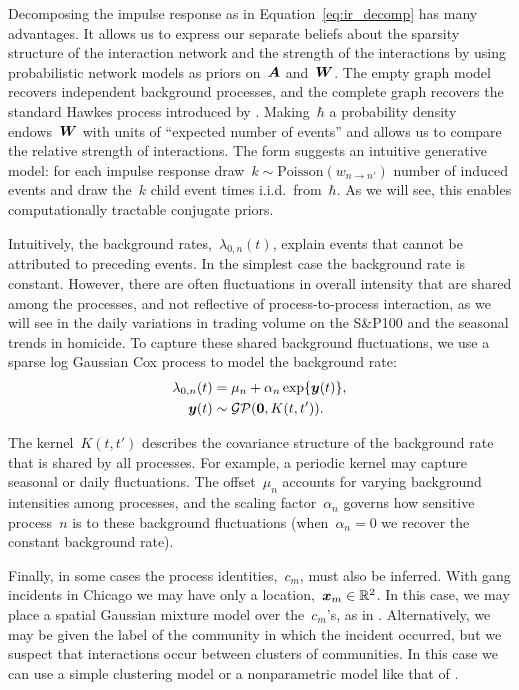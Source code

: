 Decomposing the impulse response as in Equation~\ref{eq:ir_decomp} has
many advantages. It allows us to express our separate beliefs about
the sparsity structure of the interaction network and the strength of
the interactions by using probabilistic network models as priors
on~$\boldsymbol{A}$ and~$\boldsymbol{W}$.  The empty graph model recovers independent
background processes, and the complete graph recovers the standard
Hawkes process introduced by \citet{Hawkes-1971}.  Making~$\hbar$ a
probability density endows~$\boldsymbol{W}$ with units of ``expected number of
events'' and allows us to compare the relative strength of
interactions. The form suggests an intuitive generative model: for
each impulse response draw~${k \sim \text{Poisson}(w_{n \to n'})}$
number of induced events and draw the~$k$ child event times
i.i.d.\ from~$\hbar$. As we will see, this enables computationally
tractable conjugate priors.

Intuitively, the background rates,~$\lambda_{0,n}(t)$, explain events
that cannot be attributed to preceding events. In the simplest case
the background rate is constant. However, there are often fluctuations
in overall intensity that are shared among the processes, and not
reflective of process-to-process interaction, as we will see in the
daily variations in trading volume on the S\&P100 and the seasonal
trends in homicide. To capture these shared background fluctuations,
we use a sparse log Gaussian Cox process \cite{Moller-1998} to model
the background rate:
\begin{align*}
  \lambda_{0,n}(t)
  & = \mu_{n} + \alpha_{n}\exp\{\boldsymbol{y}(t)\}, \\
  \boldsymbol{y}(t) &\sim \mathcal{GP}(\boldsymbol{0},K(t,t')).
\end{align*}

The kernel~${K(t,t')}$ describes the covariance structure of the
background rate that is shared by all processes. For example, a
periodic kernel may capture seasonal or daily fluctuations. The
offset~${\mu_n}$ accounts for varying background intensities among
processes, and the scaling factor~$\alpha_n$ governs how sensitive
process~$n$ is to these background fluctuations (when~${\alpha_n=0}$
we recover the constant background rate).

Finally, in some cases the process identities,~${c_m}$, must also be
inferred. With gang incidents in Chicago we may have only a
location,~${\boldsymbol{x}_m\in\mathbb{R}^2}$. In this case, we may place a spatial
Gaussian mixture model over the~$c_m$'s, as in
\citet{Cho-2013}. Alternatively, we may be given the label of the
community in which the incident occurred, but we suspect that
interactions occur between clusters of communities. In this case we
can use a simple clustering model or a nonparametric model like that
of \citet{Blundell-2012}.

